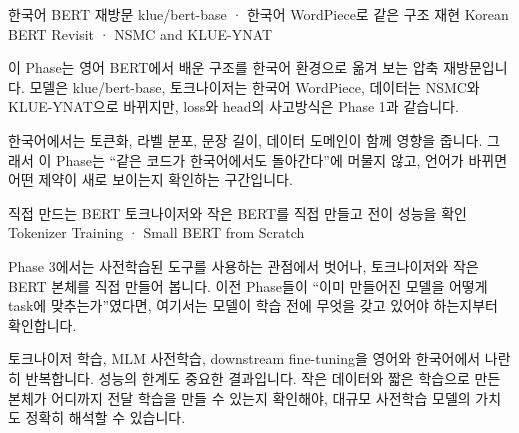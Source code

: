 \documentclass[11pt]{book}
\providecommand{\chapterdir}{chapters}
\newcommand{\inputchapter}[1]{}
\begin{document}
  {한국어 BERT 재방문}
  {klue/bert-base · 한국어 WordPiece로 같은 구조 재현}
  {Korean BERT Revisit · NSMC and KLUE-YNAT}
  {
    이 Phase는 영어 BERT에서 배운 구조를 한국어 환경으로 옮겨 보는 압축 재방문입니다. 모델은 klue/bert-base, 토크나이저는 한국어 WordPiece, 데이터는 NSMC와 KLUE-YNAT으로 바뀌지만, loss와 head의 사고방식은 Phase 1과 같습니다.

    한국어에서는 토큰화, 라벨 분포, 문장 길이, 데이터 도메인이 함께 영향을 줍니다. 그래서 이 Phase는 “같은 코드가 한국어에서도 돌아간다”에 머물지 않고, 언어가 바뀌면 어떤 제약이 새로 보이는지 확인하는 구간입니다.
  }
  {
  }
\inputchapter{ch15_ko_binary}
\inputchapter{ch16_ko_multiclass}
\inputchapter{ch17_ko_multilabel}
\inputchapter{ch18_ko_auxiliary}

  {직접 만드는 BERT}
  {토크나이저와 작은 BERT를 직접 만들고 전이 성능을 확인}
  {Tokenizer Training · Small BERT from Scratch}
  {
    Phase 3에서는 사전학습된 도구를 사용하는 관점에서 벗어나, 토크나이저와 작은 BERT 본체를 직접 만들어 봅니다. 이전 Phase들이 “이미 만들어진 모델을 어떻게 task에 맞추는가”였다면, 여기서는 모델이 학습 전에 무엇을 갖고 있어야 하는지부터 확인합니다.

    토크나이저 학습, MLM 사전학습, downstream fine-tuning을 영어와 한국어에서 나란히 반복합니다. 성능의 한계도 중요한 결과입니다. 작은 데이터와 짧은 학습으로 만든 본체가 어디까지 전달 학습을 만들 수 있는지 확인해야, 대규모 사전학습 모델의 가치도 정확히 해석할 수 있습니다.
  }
  {
  }
\inputchapter{ch19_tokenizer_training}
\inputchapter{ch20_en_bert_pretrain}
\inputchapter{ch21_en_bert_classify}
\inputchapter{ch22_ko_bert_pretrain}
\inputchapter{ch23_ko_bert_classify}
\end{document}
